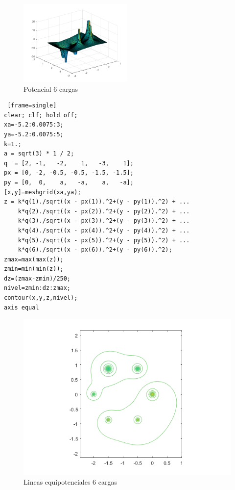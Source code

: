\documentclass{article}
\begin{document}
\begin{figure}[H]
\centering
    \includegraphics[width=0.5\textwidth]{images/002B.png}
    \caption{Potencial 6 cargas}
\end{figure}

\begin{lstlisting} [frame=single]
clear; clf; hold off;
xa=-5.2:0.0075:3;
ya=-5.2:0.0075:5;
k=1.; 
a = sqrt(3) * 1 / 2;
q  = [2, -1,   -2,    1,   -3,    1];
px = [0, -2, -0.5, -0.5, -1.5, -1.5];
py = [0,  0,    a,   -a,    a,   -a];
[x,y]=meshgrid(xa,ya);
z = k*q(1)./sqrt((x - px(1)).^2+(y - py(1)).^2) + ...
    k*q(2)./sqrt((x - px(2)).^2+(y - py(2)).^2) + ...
    k*q(3)./sqrt((x - px(3)).^2+(y - py(3)).^2) + ...
    k*q(4)./sqrt((x - px(4)).^2+(y - py(4)).^2) + ...
    k*q(5)./sqrt((x - px(5)).^2+(y - py(5)).^2) + ...
    k*q(6)./sqrt((x - px(6)).^2+(y - py(6)).^2);
zmax=max(max(z));
zmin=min(min(z));
dz=(zmax-zmin)/250;
nivel=zmin:dz:zmax;
contour(x,y,z,nivel);
axis equal
\end{lstlisting}

\begin{figure}[H]
\centering
    \includegraphics[width=1\textwidth]{images/002C.png}
    \caption{Lineas equipotenciales 6 cargas}
\end{figure}
\end{document}
